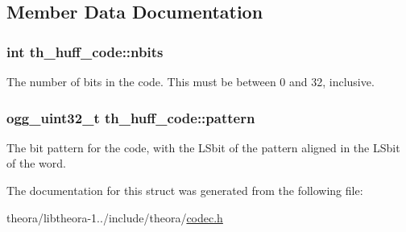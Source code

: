 \subsection{Member Data Documentation}
\hypertarget{structth__huff__code_aaf97b8f2f90042f7bc136a7b2bc35e35}{
\subsubsection[{nbits}]{\setlength{\rightskip}{0pt plus 5cm}int th\+\_\+huff\+\_\+code\+::nbits}}\label{structth__huff__code_aaf97b8f2f90042f7bc136a7b2bc35e35}
The number of bits in the code. This must be between 0 and 32, inclusive. \hypertarget{structth__huff__code_a6dd29e3aa5a0c5a2dd5ce1f45b1162b4}{
\subsubsection[{pattern}]{\setlength{\rightskip}{0pt plus 5cm}ogg\+\_\+uint32\+\_\+t th\+\_\+huff\+\_\+code\+::pattern}}\label{structth__huff__code_a6dd29e3aa5a0c5a2dd5ce1f45b1162b4}
The bit pattern for the code, with the L\+Sbit of the pattern aligned in the L\+Sbit of the word. 

The documentation for this struct was generated from the following file\+:\begin{DoxyCompactItemize}
\item 
theora/libtheora-\/1../include/theora/\hyperlink{theora_2libtheora-1_81_81_2include_2theora_2codec_8h}{codec.\+h}\end{DoxyCompactItemize}
